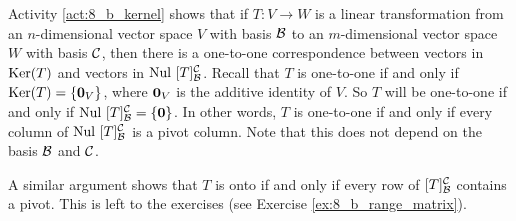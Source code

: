 Activity \ref{act:8_b_kernel} shows that if $T: V \to W$ is a linear transformation from an $n$-dimensional vector space $V$ with basis $\mathcal{B}$ to an $m$-dimensional vector space $W$ with basis $\mathcal{C}$, then there is a one-to-one correspondence between vectors in $\text{Ker}(T)$ and vectors in $\text{Nul } [T]_{\mathcal{B}}^{\mathcal{C}}$. Recall that $T$ is one-to-one if and only if $\text{Ker}(T) = \{\mathbf{0}_V\}$, where $\mathbf{0}_V$ is the additive identity of $V$. So $T$ will be one-to-one if and only if $\text{Nul } [T]_{\mathcal{B}}^{\mathcal{C}} = \{\mathbf{0}\}$. In other words, $T$ is one-to-one if and only if every column of $\text{Nul } [T]_{\mathcal{B}}^{\mathcal{C}}$ is a pivot column. Note that this does not depend on the basis $\mathcal{B}$ and $\mathcal{C}$. 

A similar argument shows that $T$ is onto if and only if every row of $[T]_{\mathcal{B}}^{\mathcal{C}}$ contains a pivot. This is left to the exercises (see Exercise \ref{ex:8_b_range_matrix}).

\label{sec:mtxof_trans_exam}

\ExampleIntro

